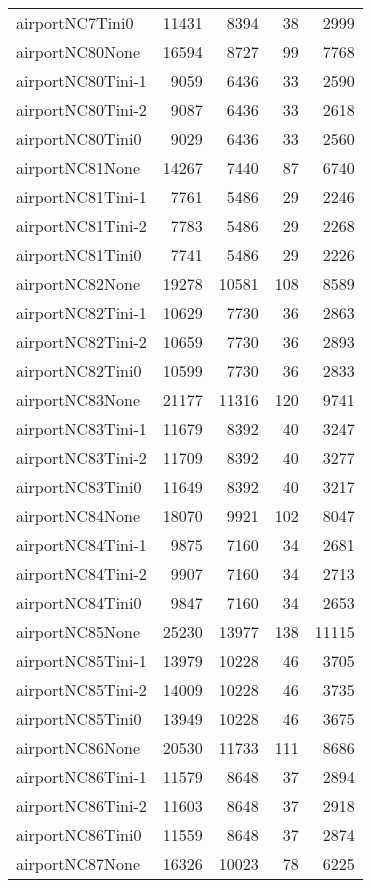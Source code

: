\begin{longtable}{lrrrr}
airportNC7Tini0 & 11431 & 8394 & 38 & 2999 \\
airportNC80None & 16594 & 8727 & 99 & 7768 \\
airportNC80Tini-1 & 9059 & 6436 & 33 & 2590 \\
airportNC80Tini-2 & 9087 & 6436 & 33 & 2618 \\
airportNC80Tini0 & 9029 & 6436 & 33 & 2560 \\
airportNC81None & 14267 & 7440 & 87 & 6740 \\
airportNC81Tini-1 & 7761 & 5486 & 29 & 2246 \\
airportNC81Tini-2 & 7783 & 5486 & 29 & 2268 \\
airportNC81Tini0 & 7741 & 5486 & 29 & 2226 \\
airportNC82None & 19278 & 10581 & 108 & 8589 \\
airportNC82Tini-1 & 10629 & 7730 & 36 & 2863 \\
airportNC82Tini-2 & 10659 & 7730 & 36 & 2893 \\
airportNC82Tini0 & 10599 & 7730 & 36 & 2833 \\
airportNC83None & 21177 & 11316 & 120 & 9741 \\
airportNC83Tini-1 & 11679 & 8392 & 40 & 3247 \\
airportNC83Tini-2 & 11709 & 8392 & 40 & 3277 \\
airportNC83Tini0 & 11649 & 8392 & 40 & 3217 \\
airportNC84None & 18070 & 9921 & 102 & 8047 \\
airportNC84Tini-1 & 9875 & 7160 & 34 & 2681 \\
airportNC84Tini-2 & 9907 & 7160 & 34 & 2713 \\
airportNC84Tini0 & 9847 & 7160 & 34 & 2653 \\
airportNC85None & 25230 & 13977 & 138 & 11115 \\
airportNC85Tini-1 & 13979 & 10228 & 46 & 3705 \\
airportNC85Tini-2 & 14009 & 10228 & 46 & 3735 \\
airportNC85Tini0 & 13949 & 10228 & 46 & 3675 \\
airportNC86None & 20530 & 11733 & 111 & 8686 \\
airportNC86Tini-1 & 11579 & 8648 & 37 & 2894 \\
airportNC86Tini-2 & 11603 & 8648 & 37 & 2918 \\
airportNC86Tini0 & 11559 & 8648 & 37 & 2874 \\
airportNC87None & 16326 & 10023 & 78 & 6225 \\

\end{longtable}
